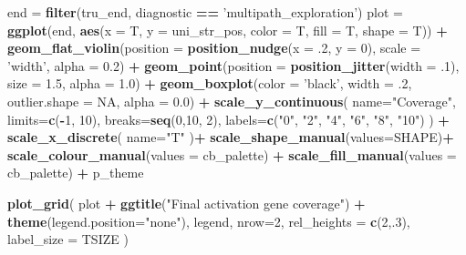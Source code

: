 \documentclass[]{book}
\newenvironment{Shaded}{\begin{snugshade}}{\end{snugshade}}
\newcommand{\DataTypeTok}[1]{\textcolor[rgb]{0.13,0.29,0.53}{#1}}
\newcommand{\DecValTok}[1]{\textcolor[rgb]{0.00,0.00,0.81}{#1}}
\newcommand{\FloatTok}[1]{\textcolor[rgb]{0.00,0.00,0.81}{#1}}
\newcommand{\KeywordTok}[1]{\textcolor[rgb]{0.13,0.29,0.53}{\textbf{#1}}}
\newcommand{\NormalTok}[1]{#1}
\newcommand{\OperatorTok}[1]{\textcolor[rgb]{0.81,0.36,0.00}{\textbf{#1}}}
\newcommand{\OtherTok}[1]{\textcolor[rgb]{0.56,0.35,0.01}{#1}}
\newcommand{\StringTok}[1]{\textcolor[rgb]{0.31,0.60,0.02}{#1}}
\begin{document}
\begin{Shaded}
\begin{Highlighting}[]
\NormalTok{end =}\StringTok{ }\KeywordTok{filter}\NormalTok{(tru_end, diagnostic }\OperatorTok{==}\StringTok{ 'multipath_exploration'}\NormalTok{)}
\NormalTok{plot =}\StringTok{ }\KeywordTok{ggplot}\NormalTok{(end, }\KeywordTok{aes}\NormalTok{(}\DataTypeTok{x =}\NormalTok{ T, }\DataTypeTok{y =}\NormalTok{ uni_str_pos, }\DataTypeTok{color =}\NormalTok{ T, }\DataTypeTok{fill =}\NormalTok{ T, }\DataTypeTok{shape =}\NormalTok{ T)) }\OperatorTok{+}
\StringTok{  }\KeywordTok{geom_flat_violin}\NormalTok{(}\DataTypeTok{position =} \KeywordTok{position_nudge}\NormalTok{(}\DataTypeTok{x =} \FloatTok{.2}\NormalTok{, }\DataTypeTok{y =} \DecValTok{0}\NormalTok{), }\DataTypeTok{scale =} \StringTok{'width'}\NormalTok{, }\DataTypeTok{alpha =} \FloatTok{0.2}\NormalTok{) }\OperatorTok{+}
\StringTok{  }\KeywordTok{geom_point}\NormalTok{(}\DataTypeTok{position =} \KeywordTok{position_jitter}\NormalTok{(}\DataTypeTok{width =} \FloatTok{.1}\NormalTok{), }\DataTypeTok{size =} \FloatTok{1.5}\NormalTok{, }\DataTypeTok{alpha =} \FloatTok{1.0}\NormalTok{) }\OperatorTok{+}
\StringTok{  }\KeywordTok{geom_boxplot}\NormalTok{(}\DataTypeTok{color =} \StringTok{'black'}\NormalTok{, }\DataTypeTok{width =} \FloatTok{.2}\NormalTok{, }\DataTypeTok{outlier.shape =} \OtherTok{NA}\NormalTok{, }\DataTypeTok{alpha =} \FloatTok{0.0}\NormalTok{) }\OperatorTok{+}
\StringTok{  }\KeywordTok{scale_y_continuous}\NormalTok{(}
    \DataTypeTok{name=}\StringTok{"Coverage"}\NormalTok{,}
    \DataTypeTok{limits=}\KeywordTok{c}\NormalTok{(}\OperatorTok{-}\DecValTok{1}\NormalTok{, }\DecValTok{10}\NormalTok{),}
    \DataTypeTok{breaks=}\KeywordTok{seq}\NormalTok{(}\DecValTok{0}\NormalTok{,}\DecValTok{10}\NormalTok{, }\DecValTok{2}\NormalTok{),}
    \DataTypeTok{labels=}\KeywordTok{c}\NormalTok{(}\StringTok{"0"}\NormalTok{, }\StringTok{"2"}\NormalTok{, }\StringTok{"4"}\NormalTok{, }\StringTok{"6"}\NormalTok{, }\StringTok{"8"}\NormalTok{, }\StringTok{"10"}\NormalTok{)}
\NormalTok{  ) }\OperatorTok{+}
\StringTok{  }\KeywordTok{scale_x_discrete}\NormalTok{(}
    \DataTypeTok{name=}\StringTok{"T"}
\NormalTok{  )}\OperatorTok{+}
\StringTok{  }\KeywordTok{scale_shape_manual}\NormalTok{(}\DataTypeTok{values=}\NormalTok{SHAPE)}\OperatorTok{+}
\StringTok{  }\KeywordTok{scale_colour_manual}\NormalTok{(}\DataTypeTok{values =}\NormalTok{ cb_palette) }\OperatorTok{+}
\StringTok{  }\KeywordTok{scale_fill_manual}\NormalTok{(}\DataTypeTok{values =}\NormalTok{ cb_palette) }\OperatorTok{+}
\StringTok{  }\NormalTok{p_theme}

\KeywordTok{plot_grid}\NormalTok{(}
\NormalTok{  plot }\OperatorTok{+}
\StringTok{    }\KeywordTok{ggtitle}\NormalTok{(}\StringTok{"Final activation gene coverage"}\NormalTok{) }\OperatorTok{+}
\StringTok{    }\KeywordTok{theme}\NormalTok{(}\DataTypeTok{legend.position=}\StringTok{"none"}\NormalTok{),}
\NormalTok{  legend,}
  \DataTypeTok{nrow=}\DecValTok{2}\NormalTok{,}
  \DataTypeTok{rel_heights =} \KeywordTok{c}\NormalTok{(}\DecValTok{2}\NormalTok{,.}\DecValTok{3}\NormalTok{),}
  \DataTypeTok{label_size =}\NormalTok{ TSIZE}
\NormalTok{)}
\end{Highlighting}
\end{Shaded}
\end{document}
